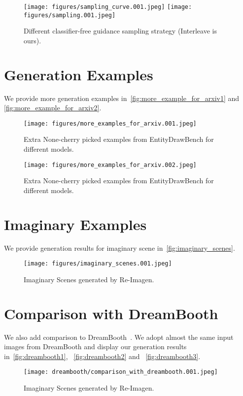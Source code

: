\documentclass{article} \usepackage{iclr2023_conference,times}
\newcommand{\modelname}{{Re-Imagen}\xspace}
\begin{document}
\begin{figure}[!h]
    \centering
    \texttt{[image: figures/sampling\_curve.001.jpeg]}
    \texttt{[image: figures/sampling.001.jpeg]}
    \caption{Different classifier-free guidance sampling strategy (Interleave is ours). }
    \vspace{-1ex}
    \label{fig:sample}
\end{figure}

\clearpage
\section{Generation Examples}
\label{appendix:more_results}
We provide more generation examples in~\autoref{fig:more_example_for_arxiv1} and \autoref{fig:more_example_for_arxiv2}.
\begin{figure}[!h]
    \centering
    \texttt{[image: figures/more\_examples\_for\_arxiv.001.jpeg]}
    \caption{Extra None-cherry picked examples from EntityDrawBench for different models. }
    \vspace{-1ex}
    \label{fig:more_example_for_arxiv1}
\end{figure}

\begin{figure}[!h]
    \centering
    \texttt{[image: figures/more\_examples\_for\_arxiv.002.jpeg]}
    \caption{Extra None-cherry picked examples from EntityDrawBench for different models. }
    \vspace{-1ex}
    \label{fig:more_example_for_arxiv2}
\end{figure}

\clearpage
\section{Imaginary Examples}
We provide generation results for imaginary scene in~\autoref{fig:imaginary_scenes}.
\begin{figure}[!h]
    \centering
    \texttt{[image: figures/imaginary\_scenes.001.jpeg]}
    \caption{Imaginary Scenes generated by \modelname. }
    \vspace{-1ex}
    \label{fig:imaginary_scenes}
\end{figure}

\clearpage
\section{Comparison with DreamBooth}
\label{appendix:dreambooth}
We also add comparison to DreamBooth~\citep{ruiz2022dreambooth}. We adopt almost the same input images from DreamBooth and display our generation results in~\autoref{fig:dreambooth1}, ~\autoref{fig:dreambooth2} and ~\autoref{fig:dreambooth3}. 
\begin{figure}[!h]
    \centering
    \texttt{[image: dreambooth/comparison\_with\_dreambooth.001.jpeg]}
    \caption{Imaginary Scenes generated by \modelname. }
    \vspace{-1ex}
    \label{fig:dreambooth1}
\end{figure}
\end{document}

